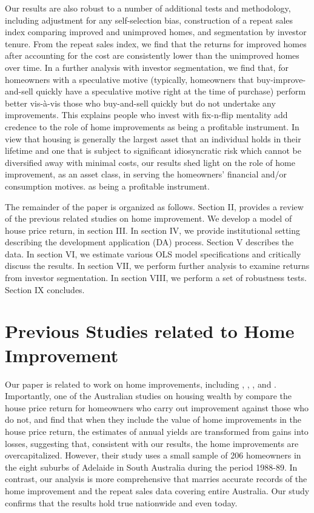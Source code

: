 \documentclass[AEJ,reqno, draftmode]{AEA} %
\begin{document}
Our results are also robust to a number of additional tests and methodology, including adjustment for any self-selection bias, construction of a repeat sales index comparing improved and unimproved homes, and segmentation by investor tenure. From the repeat sales index, we find that the returns for improved homes after accounting for the cost are consistently lower than the unimproved homes over time. In a further analysis with investor segmentation, we find that, for homeowners with a speculative motive (typically, homeowners that buy-improve-and-sell quickly have a speculative motive right at the time of purchase) perform better vis-à-vis those who buy-and-sell quickly but do not undertake any improvements. This explains people who invest with fix-n-flip mentality add credence to the role of home improvements as being a profitable instrument. In view that housing is generally the largest asset that an individual holds in their lifetime and one that is subject to significant idiosyncratic risk which cannot be diversified away with minimal costs, our results shed light on the role of home improvement, as an asset class, in serving the homeowners' financial and/or consumption motives. as being a profitable instrument. 

The remainder of the paper is organized as follows. Section II, provides a review of the previous related studies on home improvement. We develop a model of house price return, in section III. In section IV, we provide institutional setting describing the development application (DA) process. Section V describes the data. In section VI, we estimate various OLS model specifications and critically discuss the results. In section VII, we perform further analysis to examine returns from investor segmentation. In section VIII, we perform a set of robustness tests. Section IX concludes.



\section{Previous Studies related to Home Improvement}

Our paper is related to work on home improvements, including \cite{badcock1994snakes}, \cite{choi2014speculating}, \cite{gyourko2004reinvestment}, \cite{helms2003understanding} and \cite{montgomery1992explaining}. Importantly, one of the Australian studies on housing wealth by \cite{badcock1994snakes} compare the house price return for homeowners who carry out improvement against those who do not, and find that when they include the value of home improvements in the house price return, the estimates of annual yields are transformed from gains into losses, suggesting that, consistent with our results, the home improvements are overcapitalized. However, their study uses a small sample of 206 homeowners in the eight suburbs of Adelaide in South Australia during the period 1988-89. In contrast, our analysis is more comprehensive that marries accurate records of the home improvement and the repeat sales data covering entire Australia. Our study confirms that the results hold true nationwide and even today.
\end{document}
